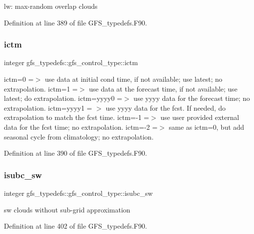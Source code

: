 lw\+: max-\/random overlap clouds 



Definition at line 389 of file G\+F\+S\+\_\+typedefs.\+F90.

\mbox{\label{structgfs__typedefs_1_1gfs__control__type_afbc1033e1b036252633e1b0f700e553f}} 
\subsubsection{ictm}
{\footnotesize\ttfamily integer gfs\+\_\+typedefs\+::gfs\+\_\+control\+\_\+type\+::ictm}



ictm=0 =$>$ use data at initial cond time, if not available; use latest; no extrapolation. ictm=1 =$>$ use data at the forecast time, if not available; use latest; do extrapolation. ictm=yyyy0 =$>$ use yyyy data for the forecast time; no extrapolation. ictm=yyyy1 = $>$ use yyyy data for the fcst. If needed, do extrapolation to match the fcst time. ictm=-\/1 =$>$ use user provided external data for the fcst time; no extrapolation. ictm=-\/2 =$>$ same as ictm=0, but add seasonal cycle from climatology; no extrapolation. 



Definition at line 390 of file G\+F\+S\+\_\+typedefs.\+F90.

\mbox{\label{structgfs__typedefs_1_1gfs__control__type_a81a6ab8b08ef423ecba18b7c5749f800}} 
\subsubsection{isubc\+\_\+sw}
{\footnotesize\ttfamily integer gfs\+\_\+typedefs\+::gfs\+\_\+control\+\_\+type\+::isubc\+\_\+sw}



sw clouds without sub-\/grid approximation 



Definition at line 402 of file G\+F\+S\+\_\+typedefs.\+F90.

\mbox{\label{structgfs__typedefs_1_1gfs__control__type_a4bbbadb8ed3d70fa2ad35b2bfa78d838}} 
